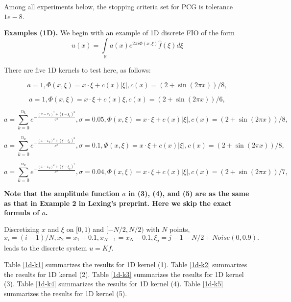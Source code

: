 \documentclass[11pt]{article}
\begin{document}
Among all experiments below, the stopping criteria set for PCG is tolerance $1e-8$.

\textbf{Examples (1D).} We begin with an example of 1D discrete FIO of the form
\begin{equation*}
u(x) = \int\limits_{\mathbb{R}}a(x)e^{2\pi i \Phi(x, \xi)}\hat{f}(\xi) d\xi
\end{equation*}


There are five 1D kernels to test here, as follows:

\begin{equation}
a = 1, \Phi(x,\xi) = x\cdot\xi + c(x)|\xi|, c(x) = (2+\sin(2\pi x))/8,
\end{equation}

\begin{equation}
a = 1, \Phi(x,\xi) = x\cdot\xi + c(x)\xi, c(x) = (2+\sin(2\pi x))/6,
\end{equation}

\begin{equation}
a = \sum\limits_{k=0}^{n_{k}} e^{-\frac{(x-x_{k})^2 + (\xi-\xi_{k})^2}{\sigma^2}}, \sigma = 0.05, \Phi(x,\xi) = x\cdot\xi + c(x)|\xi|, c(x) = (2+\sin(2\pi x))/8,
\end{equation}

\begin{equation}
a = \sum\limits_{k=0}^{n_{k}} e^{-\frac{(x-x_{k})^2 + (\xi-\xi_{k})^2}{\sigma^2}}, \sigma = 0.1, \Phi(x,\xi) = x\cdot\xi + c(x)|\xi|, c(x) = (2+\sin(2\pi x))/8,
\end{equation}

\begin{equation}
a = \sum\limits_{k=0}^{n_{k}} e^{-\frac{(x-x_{k})^2 + (\xi-\xi_{k})^2}{\sigma^2}}, \sigma = 0.04, \Phi(x,\xi) = x\cdot\xi + c(x)|\xi|, c(x) = (2+\sin(2\pi x))/7,
\end{equation}


\textbf{Note that the amplitude function $a$ in (3), (4), and (5) are as the same as that in Example 2 in Lexing's preprint. Here we skip the exact formula of $a$.}

Discretizing $x$ and $\xi$ on $[0,1)$ and $[-N/2, N/2)$ with $N$ points,
\begin{equation*}
x_{i} = (i-1)/N, x_{2} = x_{1} + 0.1, x_{N-1} = x_{N}-0.1, \xi_{j} = j-1-N/2 + Noise(0, 0.9).
\end{equation*}
leads to the discrete system $u = Kf$.



Table \ref{1d-k1} summarizes the results for 1D kernel (1).
Table \ref{1d-k2} summarizes the results for 1D kernel (2).
Table \ref{1d-k3} summarizes the results for 1D kernel (3).
Table \ref{1d-k4} summarizes the results for 1D kernel (4).
Table \ref{1d-k5} summarizes the results for 1D kernel (5).
\end{document}
